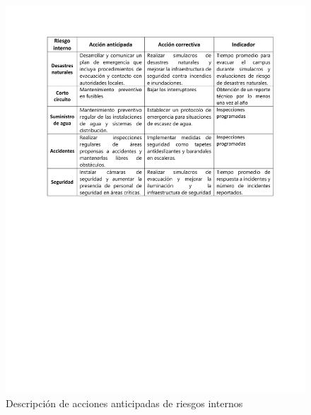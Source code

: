    \begin{figure}[H]
        \centering
        \includegraphics[trim = {1mm 120mm 1mm 10mm},clip,scale=0.45]{34/img/riesgoInterno.pdf}
        \caption{Descripción de acciones anticipadas de riesgos internos}
        \label{fig:enter-label11}
    \end{figure}
    
